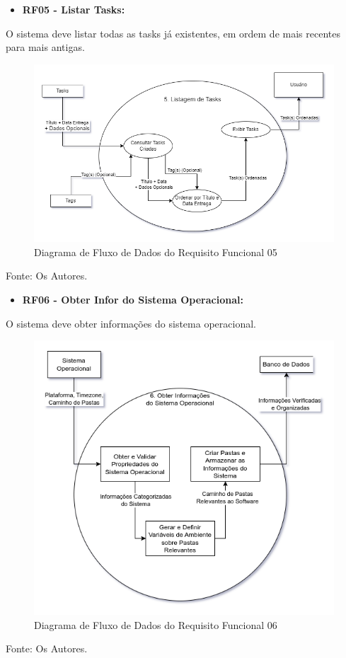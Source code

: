 \documentclass[a4paper,12pt]{article}
\begin{document}
\pagebreak
\begin{itemize}
\item\textbf{RF05 - Listar Tasks:}
\end{itemize}

O sistema deve listar todas as tasks já existentes, em ordem de mais recentes para mais antigas.
\begin{figure}[H]
	\centering
	\includegraphics[scale=0.45]{DFDs/RF05.drawio.png}
	\caption{Diagrama de Fluxo de Dados do Requisito Funcional 05}
\end{figure}
\noindent Fonte: Os Autores.

\pagebreak
\begin{itemize}
\item\textbf{RF06 - Obter Infor do Sistema Operacional:}
\end{itemize}

O sistema deve obter informações do sistema operacional.
\begin{figure}[H]
	\centering
	\includegraphics[scale=0.45]{DFDs/RF06.drawio.png}
	\caption{Diagrama de Fluxo de Dados do Requisito Funcional 06}
\end{figure}
\noindent Fonte: Os Autores.
\end{document}
